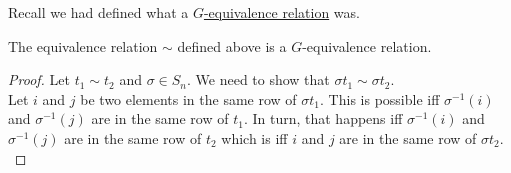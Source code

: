 
Recall we had defined what a \hyperref[defn:leftcongruence]{$G$-equivalence relation} was.

\begin{prop}%
	The equivalence relation $\sim$ defined above is a $G$-equivalence relation.
\end{prop}
\begin{proof} 
	Let $t_1 \sim t_2$ and $\sigma \in S_n.$ We need to show that $\sigma t_1 \sim \sigma t_2.$\\
	Let $i$ and $j$ be two elements in the same row of $\sigma t_1.$ This is possible iff $\sigma^{-1}(i)$ and $\sigma^{-1}(j)$ are in the same row of $t_1.$ In turn, that happens iff $\sigma^{-1}(i)$ and $\sigma^{-1}(j)$ are in the same row of $t_2$ which is iff $i$ and $j$ are in the same row of $\sigma t_2.$
\end{proof}

